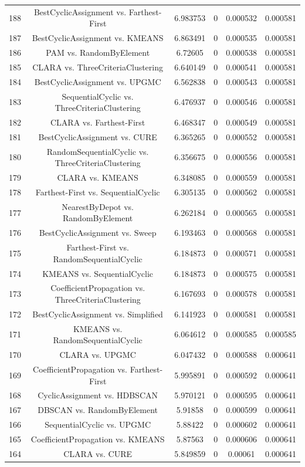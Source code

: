 \documentclass[a4paper,10pt]{article}
\begin{document}
\begin{landscape}
\begin{table}[!htp]
\begin{tabular}{cccccc}
188&BestCyclicAssignment vs. Farthest-First&6.983753&0&0.000532&0.000581\\
187&BestCyclicAssignment vs. KMEANS&6.863491&0&0.000535&0.000581\\
186&PAM vs. RandomByElement&6.72605&0&0.000538&0.000581\\
185&CLARA vs. ThreeCriteriaClustering&6.640149&0&0.000541&0.000581\\
184&BestCyclicAssignment vs. UPGMC&6.562838&0&0.000543&0.000581\\
183&SequentialCyclic vs. ThreeCriteriaClustering&6.476937&0&0.000546&0.000581\\
182&CLARA vs. Farthest-First&6.468347&0&0.000549&0.000581\\
181&BestCyclicAssignment vs. CURE&6.365265&0&0.000552&0.000581\\
180&RandomSequentialCyclic vs. ThreeCriteriaClustering&6.356675&0&0.000556&0.000581\\
179&CLARA vs. KMEANS&6.348085&0&0.000559&0.000581\\
178&Farthest-First vs. SequentialCyclic&6.305135&0&0.000562&0.000581\\
177&NearestByDepot vs. RandomByElement&6.262184&0&0.000565&0.000581\\
176&BestCyclicAssignment vs. Sweep&6.193463&0&0.000568&0.000581\\
175&Farthest-First vs. RandomSequentialCyclic&6.184873&0&0.000571&0.000581\\
174&KMEANS vs. SequentialCyclic&6.184873&0&0.000575&0.000581\\
173&CoefficientPropagation vs. ThreeCriteriaClustering&6.167693&0&0.000578&0.000581\\
172&BestCyclicAssignment vs. Simplified&6.141923&0&0.000581&0.000581\\
171&KMEANS vs. RandomSequentialCyclic&6.064612&0&0.000585&0.000585\\
170&CLARA vs. UPGMC&6.047432&0&0.000588&0.000641\\
169&CoefficientPropagation vs. Farthest-First&5.995891&0&0.000592&0.000641\\
168&CyclicAssignment vs. HDBSCAN&5.970121&0&0.000595&0.000641\\
167&DBSCAN vs. RandomByElement&5.91858&0&0.000599&0.000641\\
166&SequentialCyclic vs. UPGMC&5.88422&0&0.000602&0.000641\\
165&CoefficientPropagation vs. KMEANS&5.87563&0&0.000606&0.000641\\
164&CLARA vs. CURE&5.849859&0&0.00061&0.000641\\

\end{tabular}
\end{table}
\end{landscape}
\end{document}
